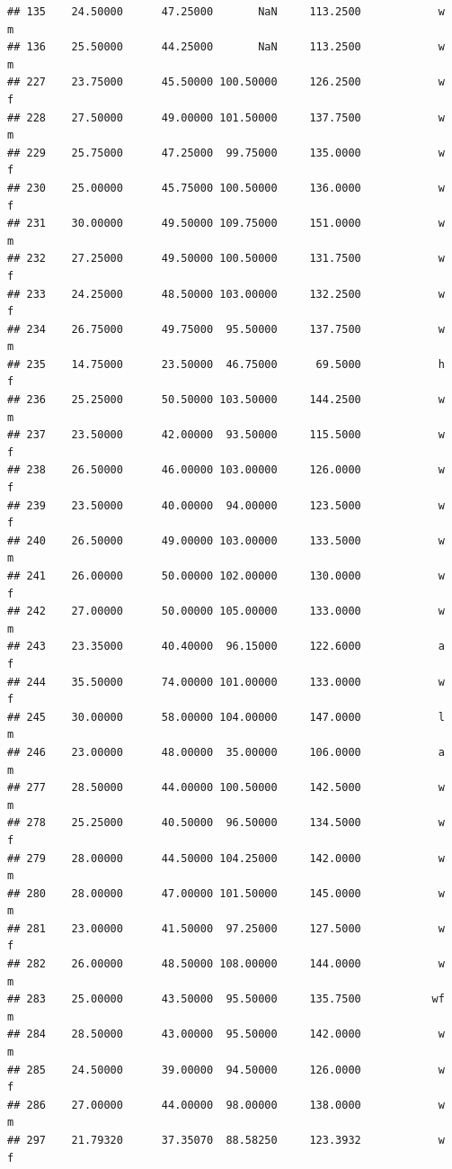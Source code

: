 \documentclass[]{article}
\begin{document}
\begin{verbatim}
## 135    24.50000      47.25000       NaN     113.2500            w         m
## 136    25.50000      44.25000       NaN     113.2500            w         m
## 227    23.75000      45.50000 100.50000     126.2500            w         f
## 228    27.50000      49.00000 101.50000     137.7500            w         m
## 229    25.75000      47.25000  99.75000     135.0000            w         f
## 230    25.00000      45.75000 100.50000     136.0000            w         f
## 231    30.00000      49.50000 109.75000     151.0000            w         m
## 232    27.25000      49.50000 100.50000     131.7500            w         f
## 233    24.25000      48.50000 103.00000     132.2500            w         f
## 234    26.75000      49.75000  95.50000     137.7500            w         m
## 235    14.75000      23.50000  46.75000      69.5000            h         f
## 236    25.25000      50.50000 103.50000     144.2500            w         m
## 237    23.50000      42.00000  93.50000     115.5000            w         f
## 238    26.50000      46.00000 103.00000     126.0000            w         f
## 239    23.50000      40.00000  94.00000     123.5000            w         f
## 240    26.50000      49.00000 103.00000     133.5000            w         m
## 241    26.00000      50.00000 102.00000     130.0000            w         f
## 242    27.00000      50.00000 105.00000     133.0000            w         m
## 243    23.35000      40.40000  96.15000     122.6000            a         f
## 244    35.50000      74.00000 101.00000     133.0000            w         f
## 245    30.00000      58.00000 104.00000     147.0000            l         m
## 246    23.00000      48.00000  35.00000     106.0000            a         m
## 277    28.50000      44.00000 100.50000     142.5000            w         m
## 278    25.25000      40.50000  96.50000     134.5000            w         f
## 279    28.00000      44.50000 104.25000     142.0000            w         m
## 280    28.00000      47.00000 101.50000     145.0000            w         m
## 281    23.00000      41.50000  97.25000     127.5000            w         f
## 282    26.00000      48.50000 108.00000     144.0000            w         m
## 283    25.00000      43.50000  95.50000     135.7500           wf         m
## 284    28.50000      43.00000  95.50000     142.0000            w         m
## 285    24.50000      39.00000  94.50000     126.0000            w         f
## 286    27.00000      44.00000  98.00000     138.0000            w         m
## 297    21.79320      37.35070  88.58250     123.3932            w         f

\end{verbatim}
\end{document}
